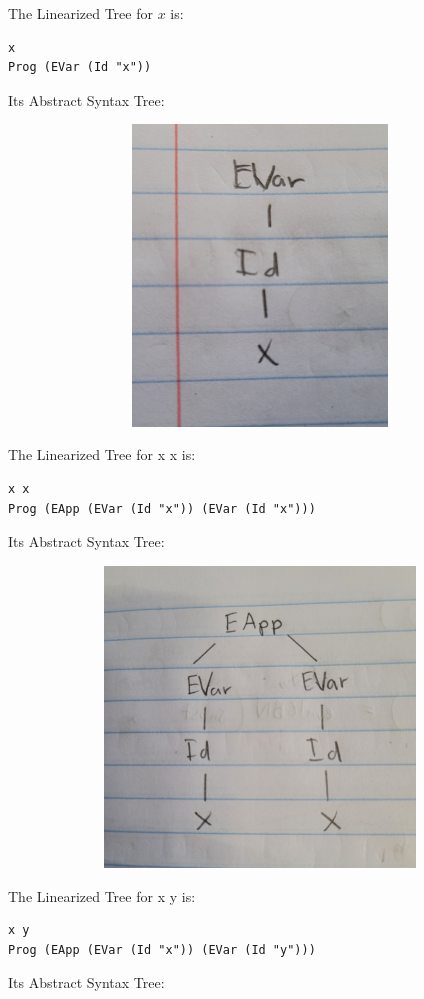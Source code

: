 \documentclass{article}
\theoremstyle{theorem}
\theoremstyle{definition}
\theoremstyle{remark}
\begin{document}
The Linearized Tree for $x$ is:
\begin{lstlisting}
x
Prog (EVar (Id "x"))
\end{lstlisting}

Its Abstract Syntax Tree:

\includegraphics[width=15cm, height=8cm]{Report Images/week5_1.jpg}

The Linearized Tree for x x is:
\begin{lstlisting}
x x
Prog (EApp (EVar (Id "x")) (EVar (Id "x")))
\end{lstlisting}

Its Abstract Syntax Tree:

\includegraphics[width=15cm, height=8cm]{Report Images/week5_2.jpg}

The Linearized Tree for x y is:
\begin{lstlisting}
x y
Prog (EApp (EVar (Id "x")) (EVar (Id "y")))
\end{lstlisting}

Its Abstract Syntax Tree:
\end{document}
